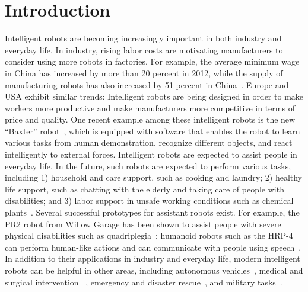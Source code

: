 \chapter{Introduction}
\label{chp:intro}
Intelligent robots are becoming increasingly important in both industry and everyday life. In industry, rising labor costs are motivating manufacturers to consider using more robots in factories. For example, the average minimum wage in China has increased by more than 20 percent in 2012, while the supply of manufacturing robots has also increased by 51 percent in China~\cite{IFR:report}. 
Europe and USA exhibit similar trends: Intelligent robots are being designed in order to make workers more productive and make manufacturers more competitive in terms of price and quality. One recent example among these intelligent robots is the new ``Baxter'' robot~\cite{Brooks:2012:Baxter}, which is equipped with software that enables the robot to learn various tasks from human demonstration, recognize different objects, and react intelligently to external forces. Intelligent robots are expected to assist people in everyday life. In the future, such robots are expected to perform various tasks, including 1) household and care support, such as cooking and laundry; 2) healthy life support, such as chatting with the elderly and taking care of people with disabilities; and 3) labor support in unsafe working conditions such as chemical plants~\cite{Yamazaki:2012}. Several successful prototypes for assistant robots exist. For example, the PR2 robot from Willow Garage has been shown to assist people with severe physical disabilities such as quadriplegia~\cite{PR2HumanityWeb}; humanoid robots such as the HRP-4 can perform human-like actions and can communicate with people using speech~\cite{HRP-Cyber}. In addition to their applications in industry and everyday life, modern intelligent robots can be helpful in other areas, including autonomous vehicles~\cite{Montemerlo:2008:JSE}, medical and surgical intervention ~\cite{Bonfe:2012}, emergency and disaster rescue~\cite{Fukushima:2011}, and military tasks~\cite{AlphaDog:2012}.



